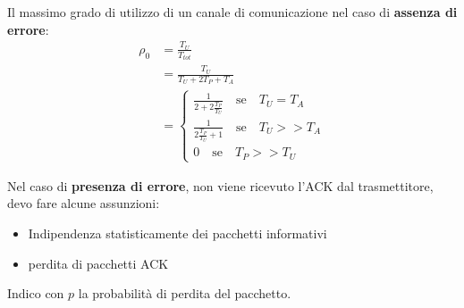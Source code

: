 Il massimo grado di utilizzo di un canale di comunicazione nel caso di \textbf{assenza di errore}:
\begin{align}
	\rho_0
	 & =\frac{T_U}{T_{tot}}                                         \\
	 & = \frac{T_U}{T_U + 2T_P + T_A}                               \\
	 & = \begin{cases}
     \frac{1}{2 + 2 \frac{T_P}{T_U}} \quad \text{se}\quad T_U = T_A  \\
		     \frac{1}{2 \frac{T_P}{T_U} + 1} \quad \text{se}\quad T_U >> T_A \\
		     0 \quad \text{se}\quad T_P >> T_U
	     \end{cases}
\end{align}



Nel caso di \textbf{presenza di errore}, non viene ricevuto l'ACK dal trasmettitore, devo fare alcune assunzioni:
\begin{itemize}
  \item Indipendenza statisticamente dei pacchetti informativi
  \item perdita di pacchetti ACK
\end{itemize}

Indico con $p$ la probabilità di perdita del pacchetto.



